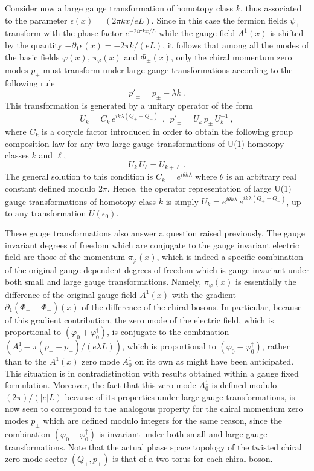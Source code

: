 \documentclass[a4paper,11pt]{article}
\begin{document}
Consider now a large gauge transformation of homotopy class $k$, thus
associated to the parameter $\epsilon(x)=(2\pi kx/eL)$. Since in this case
the fermion fields $\psi_\pm$ transform with the phase factor
$e^{-2i\pi kx/L}$ while the gauge field $A^1(x)$ is shifted by the quantity
$-\partial_1\epsilon(x)=-2\pi k/(eL)$, it follows that among all the modes
of the basic fields $\varphi(x)$, $\pi_\varphi(x)$ and $\Phi_\pm(x)$, only the
chiral momentum zero modes $p_\pm$ must transform under large gauge 
transformations according to the following rule
\begin{equation}
p'_\pm=p_\pm-\lambda k\ .
\end{equation}
This transformation is generated by a unitary operator of the form
\begin{equation}
U_k=C_k\,e^{ik\lambda(Q_++Q_-)}\ \ ,\ \ 
p'_\pm=U_k\,p_\pm\,U^{-1}_k\ ,
\end{equation}
where $C_k$ is a cocycle factor introduced in order to obtain the following
group composition law for any two large gauge transformations
of U(1) homotopy classes $k$ and $\ell$,
\begin{equation}
U_k\,U_\ell=U_{k+\ell}\ .
\end{equation}
The general solution to this condition is $C_k=e^{i\theta k\lambda}$
where $\theta$ is an arbitrary real constant defined modulo $2\pi$.
Hence, the operator representation of large U(1) gauge transformations of 
homotopy class $k$ is simply $U_k=e^{i\theta k\lambda}\,e^{ik\lambda(Q_++Q_-)}$,
up to any transformation $U(\epsilon_0)$.

These gauge transformations also answer a question raised pre\-vious\-ly.
The gauge invariant degrees of freedom which are conjugate to the gauge 
invariant electric field are those of the momentum $\pi_\varphi(x)$, which 
is indeed a specific combination of the original gauge dependent degrees of 
freedom which is gauge invariant under both small and large gauge
transformations. Namely, $\pi_\varphi(x)$ is essentially the difference of 
the original gauge field $A^1(x)$ with the gradient 
$\partial_1(\Phi_+-\Phi_-)(x)$ of the difference of the chiral bosons.
In particular, because of this gradient contribution, the zero mode of the
electric field, which is proportional to $(\varphi_0+\varphi^\dagger_0)$,
is conjugate to the combination $(A^1_0-\pi(p_++p_-)/(e\lambda L))$, 
which is proportional to $(\varphi_0-\varphi^\dagger_0)$, rather than to
the $A^1(x)$ zero mode $A^1_0$ on its own as might have been anticipated. 
This situation is in contradistinction with results obtained within a gauge 
fixed formulation.\cite{Manton,Hetrick} Moreover, the fact that this zero mode 
$A^1_0$ is defined modulo $(2\pi)/(|e|L)$ because of its properties
under large gauge transformations, is now seen to correspond to the
analogous property for the chiral momentum zero modes $p_\pm$ which
are defined modulo integers for the same reason, since the combination
$(\varphi_0-\varphi^\dagger_0)$ is invariant under both small and large
gauge transformations. Note that the actual phase space topology of the 
twisted chiral zero mode sector $(Q_\pm,p_\pm)$ is that of a two-torus for 
each chiral boson.
\end{document}
